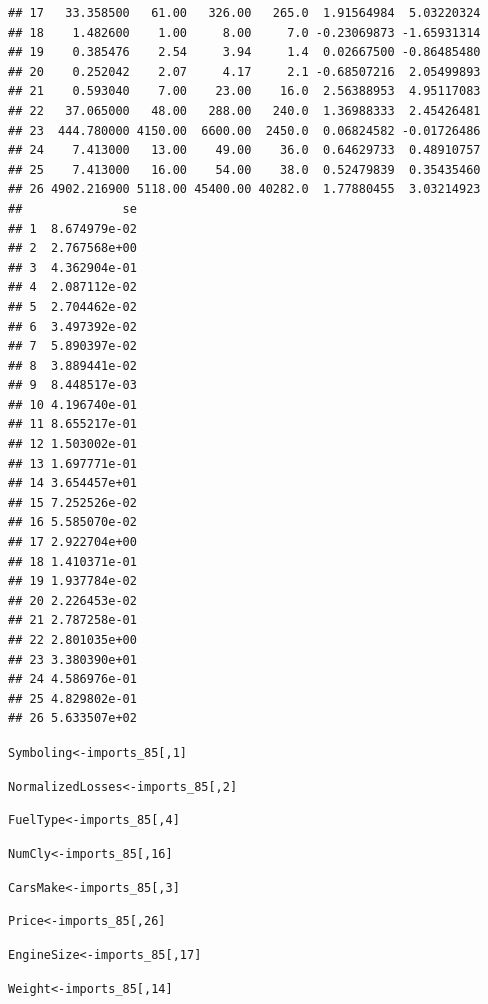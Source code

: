 \documentclass{article}\usepackage[]{graphicx}\usepackage[]{color}
\makeatletter
\newcommand{\hlnum}[1]{\textcolor[rgb]{0.686,0.059,0.569}{#1}}%
\newcommand{\hlstd}[1]{\textcolor[rgb]{0.345,0.345,0.345}{#1}}%
\newcommand{\hlkwb}[1]{\textcolor[rgb]{0.69,0.353,0.396}{#1}}%
\newenvironment{kframe}{%
 \def\at@end@of@kframe{}%
 \ifinner\ifhmode%
  \def\at@end@of@kframe{\end{minipage}}%
  \begin{minipage}{\columnwidth}%
 \fi\fi%
 \def\FrameCommand##1{\hskip\@totalleftmargin \hskip-\fboxsep
 \colorbox{shadecolor}{##1}\hskip-\fboxsep
     \hskip-\linewidth \hskip-\@totalleftmargin \hskip\columnwidth}%
 \MakeFramed {\advance\hsize-\width
   \@totalleftmargin\z@ \linewidth\hsize
   \@setminipage}}%
 {\par\unskip\endMakeFramed%
 \at@end@of@kframe}
\newenvironment{knitrout}{}{} %
\makeatother
\begin{document}
\begin{knitrout}
\begin{kframe}
\begin{verbatim}
## 17   33.358500   61.00   326.00   265.0  1.91564984  5.03220324
## 18    1.482600    1.00     8.00     7.0 -0.23069873 -1.65931314
## 19    0.385476    2.54     3.94     1.4  0.02667500 -0.86485480
## 20    0.252042    2.07     4.17     2.1 -0.68507216  2.05499893
## 21    0.593040    7.00    23.00    16.0  2.56388953  4.95117083
## 22   37.065000   48.00   288.00   240.0  1.36988333  2.45426481
## 23  444.780000 4150.00  6600.00  2450.0  0.06824582 -0.01726486
## 24    7.413000   13.00    49.00    36.0  0.64629733  0.48910757
## 25    7.413000   16.00    54.00    38.0  0.52479839  0.35435460
## 26 4902.216900 5118.00 45400.00 40282.0  1.77880455  3.03214923
##              se
## 1  8.674979e-02
## 2  2.767568e+00
## 3  4.362904e-01
## 4  2.087112e-02
## 5  2.704462e-02
## 6  3.497392e-02
## 7  5.890397e-02
## 8  3.889441e-02
## 9  8.448517e-03
## 10 4.196740e-01
## 11 8.655217e-01
## 12 1.503002e-01
## 13 1.697771e-01
## 14 3.654457e+01
## 15 7.252526e-02
## 16 5.585070e-02
## 17 2.922704e+00
## 18 1.410371e-01
## 19 1.937784e-02
## 20 2.226453e-02
## 21 2.787258e-01
## 22 2.801035e+00
## 23 3.380390e+01
## 24 4.586976e-01
## 25 4.829802e-01
## 26 5.633507e+02
\end{verbatim}
\begin{alltt}
\hlstd{Symboling} \hlkwb{<-} \hlstd{imports_85[,}\hlnum{1}\hlstd{]}

\hlstd{NormalizedLosses} \hlkwb{<-} \hlstd{imports_85[,}\hlnum{2}\hlstd{]}

\hlstd{FuelType} \hlkwb{<-} \hlstd{imports_85[,}\hlnum{4}\hlstd{]}

\hlstd{NumCly} \hlkwb{<-} \hlstd{imports_85[,}\hlnum{16}\hlstd{]}

\hlstd{CarsMake} \hlkwb{<-} \hlstd{imports_85[,}\hlnum{3}\hlstd{]}

\hlstd{Price} \hlkwb{<-} \hlstd{imports_85[,}\hlnum{26}\hlstd{]}

\hlstd{EngineSize} \hlkwb{<-} \hlstd{imports_85[,}\hlnum{17}\hlstd{]}

\hlstd{Weight} \hlkwb{<-} \hlstd{imports_85[,}\hlnum{14}\hlstd{]}


\end{alltt}
\end{kframe}
\end{knitrout}
\end{document}
